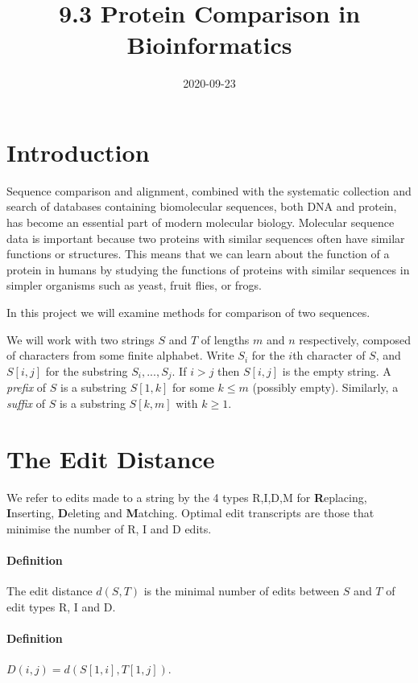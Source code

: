 \documentclass{article}
\title{9.3 Protein Comparison in Bioinformatics}
\date{2020-09-23}
\begin{document}
\maketitle

\section{Introduction}

Sequence  comparison  and  alignment,  combined  with  the  systematic  collection  and  search  of databases containing biomolecular sequences, both DNA and protein, has become an essential part of modern molecular biology.  Molecular sequence data is important because two proteins with similar sequences often have similar functions or structures.  This means that we can learn about the function of a protein in humans by studying the functions of proteins with similar sequences in simpler organisms such as yeast, fruit flies, or frogs. \par

In this project we will examine methods for comparison of two sequences. \par

We will work with two strings $S$ and $T$ of lengths $m$ and $n$ respectively, composed of characters from some finite alphabet. Write $S_i$ for the $i$th character of $S$, and $S[i,j]$ for the substring $S_i,...,S_j$. If $i>j$ then $S[i,j]$ is the empty string. A \textit{prefix} of $S$ is a substring $S[1,k]$ for some $k \leq m$ (possibly empty). Similarly, a \textit{suffix} of $S$ is a substring $S[k,m]$ with $k\geq 1$.

\newpage

\section{The Edit Distance}
We refer to edits made to a string by the 4 types R,I,D,M for \textbf{R}eplacing, \textbf{I}nserting, \textbf{D}eleting and \textbf{M}atching. Optimal edit transcripts are those that minimise the number of R, I and D edits.

\paragraph{Definition} 
The edit distance $d(S,T)$ is the minimal number of edits between $S$ and $T$ of edit types R, I and D.

\paragraph{Definition}
$D(i,j)=d(S[1,i],T[1,j])$.
\end{document}
